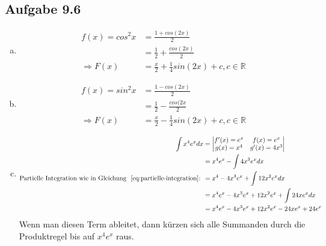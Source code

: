\documentclass{standalone}
\begin{document}
\subsection{Aufgabe 9.6}
\begin{enumerate}[a)]
\item \begin{align} 
f(x) = cos^2x &= \frac{1+cos(2x)}{2} \\
&= \frac{1}{2} + \frac{cos(2x)}{2} \\
\Rightarrow F(x) &= \frac{x}{2} + \frac{1}{4} sin(2x) + c, c \in \mathbb{R}
\end{align}
\item \begin{align}
f(x) = sin^2x &= \frac{1-cos(2x)}{2} \\
&= \frac{1}{2} - \frac{cos(2x}{2} \\
\Rightarrow F(x) &= \frac{x}{2} - \frac{1}{4} sin(2x) + c, c \in \mathbb{R}
\end{align}
\item \begin{align}
\int x^4 e^x dx &= \begin{vmatrix} \label{eq:partielle-integration}
f'(x) = e^x & f(x) = e^x \\
g(x) = x^4 & g'(x) = 4x^3
\end{vmatrix} \\
&= x^4 e^x - \int 4x^3 e^x dx \\ 
\text{Partielle Integration wie in Gleichung ~\ref{eq:partielle-integration}: }
&= x^4 - 4x^3 e^x + \int 12 x^2 e^x dx \\
&= x^4 e^x - 4x^3 e^x + 12 x^2 e^x + \int 24 x e^x dx \\
&= x^4 e^x - 4x^3 e^x + 12 x^2 e^x - 24x e^x + 24 e^x 
\end{align}
Wenn man diesen Term ableitet, dann kürzen sich alle Summanden durch die Produktregel bis auf $x^4 e^x$ raus.
\end{enumerate}
\end{document}
